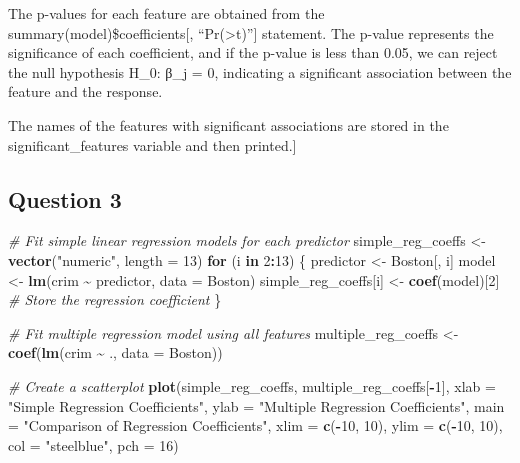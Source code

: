 \documentclass[
]{article}
\newenvironment{Shaded}{\begin{snugshade}}{\end{snugshade}}
\newcommand{\AttributeTok}[1]{\textcolor[rgb]{0.13,0.29,0.53}{#1}}
\newcommand{\CommentTok}[1]{\textcolor[rgb]{0.56,0.35,0.01}{\textit{#1}}}
\newcommand{\ControlFlowTok}[1]{\textcolor[rgb]{0.13,0.29,0.53}{\textbf{#1}}}
\newcommand{\DecValTok}[1]{\textcolor[rgb]{0.00,0.00,0.81}{#1}}
\newcommand{\FunctionTok}[1]{\textcolor[rgb]{0.13,0.29,0.53}{\textbf{#1}}}
\newcommand{\NormalTok}[1]{#1}
\newcommand{\OtherTok}[1]{\textcolor[rgb]{0.56,0.35,0.01}{#1}}
\newcommand{\SpecialCharTok}[1]{\textcolor[rgb]{0.81,0.36,0.00}{\textbf{#1}}}
\newcommand{\StringTok}[1]{\textcolor[rgb]{0.31,0.60,0.02}{#1}}
\begin{document}
The p-values for each feature are obtained from the
summary(model)\$coefficients{[},
``Pr(\textgreater\textbar t\textbar)''{]} statement. The p-value
represents the significance of each coefficient, and if the p-value is
less than 0.05, we can reject the null hypothesis H\_0: β\_j = 0,
indicating a significant association between the feature and the
response.

The names of the features with significant associations are stored in
the significant\_features variable and then printed.{]}

\hypertarget{question-3}{%
\subsection{Question 3}\label{question-3}}

\begin{Shaded}
\begin{Highlighting}[]
\CommentTok{\# Fit simple linear regression models for each predictor}
\NormalTok{simple\_reg\_coeffs }\OtherTok{\textless{}{-}} \FunctionTok{vector}\NormalTok{(}\StringTok{"numeric"}\NormalTok{, }\AttributeTok{length =} \DecValTok{13}\NormalTok{)}
\ControlFlowTok{for}\NormalTok{ (i }\ControlFlowTok{in} \DecValTok{2}\SpecialCharTok{:}\DecValTok{13}\NormalTok{) \{}
\NormalTok{  predictor }\OtherTok{\textless{}{-}}\NormalTok{ Boston[, i]}
\NormalTok{  model }\OtherTok{\textless{}{-}} \FunctionTok{lm}\NormalTok{(crim }\SpecialCharTok{\textasciitilde{}}\NormalTok{ predictor, }\AttributeTok{data =}\NormalTok{ Boston)}
\NormalTok{  simple\_reg\_coeffs[i] }\OtherTok{\textless{}{-}} \FunctionTok{coef}\NormalTok{(model)[}\DecValTok{2}\NormalTok{]  }\CommentTok{\# Store the regression coefficient}
\NormalTok{\}}

\CommentTok{\# Fit multiple regression model using all features}
\NormalTok{multiple\_reg\_coeffs }\OtherTok{\textless{}{-}} \FunctionTok{coef}\NormalTok{(}\FunctionTok{lm}\NormalTok{(crim }\SpecialCharTok{\textasciitilde{}}\NormalTok{ ., }\AttributeTok{data =}\NormalTok{ Boston))}

\CommentTok{\# Create a scatterplot}
\FunctionTok{plot}\NormalTok{(simple\_reg\_coeffs, multiple\_reg\_coeffs[}\SpecialCharTok{{-}}\DecValTok{1}\NormalTok{], }
     \AttributeTok{xlab =} \StringTok{"Simple Regression Coefficients"}\NormalTok{, }\AttributeTok{ylab =} \StringTok{"Multiple Regression Coefficients"}\NormalTok{,}
     \AttributeTok{main =} \StringTok{"Comparison of Regression Coefficients"}\NormalTok{,}
     \AttributeTok{xlim =} \FunctionTok{c}\NormalTok{(}\SpecialCharTok{{-}}\DecValTok{10}\NormalTok{, }\DecValTok{10}\NormalTok{), }\AttributeTok{ylim =} \FunctionTok{c}\NormalTok{(}\SpecialCharTok{{-}}\DecValTok{10}\NormalTok{, }\DecValTok{10}\NormalTok{),}
     \AttributeTok{col =} \StringTok{"steelblue"}\NormalTok{, }\AttributeTok{pch =} \DecValTok{16}\NormalTok{)}


\end{Highlighting}
\end{Shaded}
\end{document}
